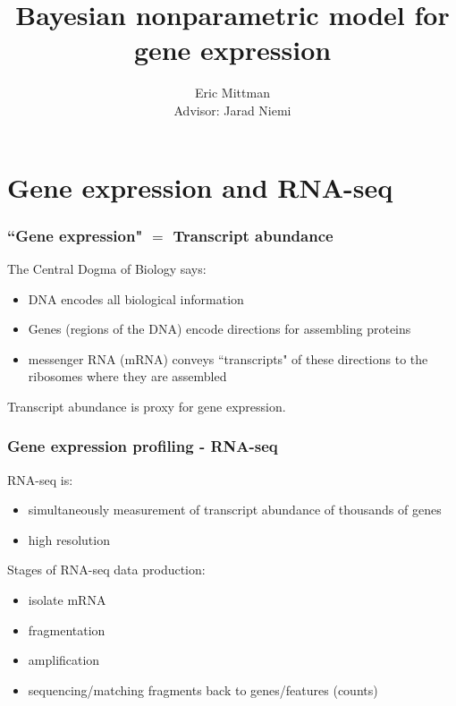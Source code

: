 \documentclass[handout]{beamer}
\title{Bayesian nonparametric model for gene expression}
\author{Eric Mittman \\ \vspace{.5cm} Advisor: Jarad Niemi}
\begin{document}
\frame{\titlepage}


\section[GE/RNA-seq]{Gene expression and RNA-seq}

\begin{frame}%
  \frametitle{``Gene expression" $=$ Transcript abundance}
  The Central Dogma of Biology says:
  \begin{itemize}
    \pause\item DNA encodes all biological information
    \pause\item Genes (regions of the DNA) encode directions for assembling proteins
    \pause\item messenger RNA (mRNA) conveys ``transcripts" of these directions to the ribosomes where they are assembled 
  \end{itemize}
  \pause Transcript abundance is proxy for gene expression.
  {\scriptsize \citep[\textit{Statistical Analysis of Next Generation Sequencing Data}]{datta2014}}
\end{frame}

\begin{frame}%
\frametitle{Gene expression profiling - RNA-seq}
  RNA-seq is:
  \vspace{.5cm}
  \begin{itemize}
    \pause \item simultaneously measurement of transcript abundance of thousands of genes
    \pause \item high resolution
  \end{itemize}

  \vspace{.5cm}
  \pause Stages of RNA-seq data production:
  \vspace{.5cm}
  \begin{itemize}
    \pause \item isolate mRNA
    \pause \item fragmentation
    \pause \item amplification
    \pause \item sequencing/matching fragments back to genes/features (counts)
  \end{itemize}
\end{frame}
\end{document}
